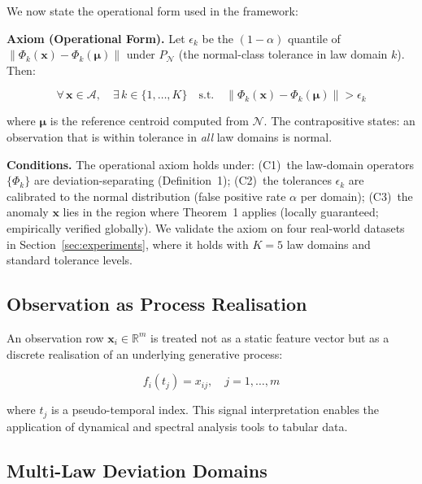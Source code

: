 \documentclass[journal]{IEEEtran}
\newcommand{\R}{\mathbb{R}}
\newcommand{\norm}[1]{\left\lVert#1\right\rVert}
\begin{document}
\vspace{0.5em}

We now state the operational form used in the framework:

\textbf{Axiom (Operational Form).} Let $\epsilon_k$ be the $(1-\alpha)$ quantile of $\norm{\Phi_k(\mathbf{x}) - \Phi_k(\boldsymbol{\mu})}$ under $P_{\mathcal{N}}$ (the normal-class tolerance in law domain $k$). Then:

\begin{equation}
\forall\, \mathbf{x} \in \mathcal{A},\quad \exists\, k \in \{1,\ldots,K\} \quad\text{s.t.}\quad \norm{\Phi_k(\mathbf{x}) - \Phi_k(\boldsymbol{\mu})} > \epsilon_k
\label{eq:axiom}
\end{equation}

where $\boldsymbol{\mu}$ is the reference centroid computed from $\mathcal{N}$. The contrapositive states: an observation that is within tolerance in \textit{all} law domains is normal.

\textbf{Conditions.} The operational axiom holds under: (C1)~the law-domain operators $\{\Phi_k\}$ are deviation-separating (Definition~1); (C2)~the tolerances $\epsilon_k$ are calibrated to the normal distribution (false positive rate $\alpha$ per domain); (C3)~the anomaly $\mathbf{x}$ lies in the region where Theorem~1 applies (locally guaranteed; empirically verified globally). We validate the axiom on four real-world datasets in Section~\ref{sec:experiments}, where it holds with $K=5$ law domains and standard tolerance levels.

\subsection{Observation as Process Realisation}
\label{ssec:observation}

An observation row $\mathbf{x}_i \in \R^m$ is treated not as a static feature vector but as a discrete realisation of an underlying generative process:

\begin{equation}
f_i(t_j) = x_{ij}, \quad j = 1, \ldots, m
\label{eq:signal}
\end{equation}

where $t_j$ is a pseudo-temporal index. This signal interpretation enables the application of dynamical and spectral analysis tools to tabular data.

\subsection{Multi-Law Deviation Domains}
\label{ssec:laws}
\end{document}
